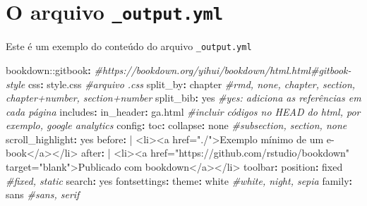 \documentclass[
]{book}
\newenvironment{Shaded}{\begin{snugshade}}{\end{snugshade}}
\newcommand{\AttributeTok}[1]{\textcolor[rgb]{0.77,0.63,0.00}{#1}}
\newcommand{\CharTok}[1]{\textcolor[rgb]{0.31,0.60,0.02}{#1}}
\newcommand{\CommentTok}[1]{\textcolor[rgb]{0.56,0.35,0.01}{\textit{#1}}}
\newcommand{\FunctionTok}[1]{\textcolor[rgb]{0.00,0.00,0.00}{#1}}
\newcommand{\KeywordTok}[1]{\textcolor[rgb]{0.13,0.29,0.53}{\textbf{#1}}}
\newcommand{\NormalTok}[1]{#1}
\begin{document}
\hypertarget{output}{%
\chapter{\texorpdfstring{O arquivo \texttt{\_output.yml}}{O arquivo \_output.yml}}\label{output}}

Este é um exemplo do conteúdo do arquivo \texttt{\_output.yml}

\begin{Shaded}
\begin{Highlighting}[]
\AttributeTok{bookdown:}\FunctionTok{:gitbook}\KeywordTok{:}\CommentTok{ \#https://bookdown.org/yihui/bookdown/html.html\#gitbook{-}style}
\AttributeTok{  }\FunctionTok{css}\KeywordTok{:}\AttributeTok{ style.css}\CommentTok{ \#arquivo .css}
\AttributeTok{  }\FunctionTok{split\_by}\KeywordTok{:}\AttributeTok{ chapter}\CommentTok{ \#rmd, none, chapter, section, chapter+number, section+number}
\AttributeTok{  }\FunctionTok{split\_bib}\KeywordTok{:}\AttributeTok{ }\CharTok{yes}\CommentTok{ \#yes: adiciona as referências em cada página}
\AttributeTok{  }\FunctionTok{includes}\KeywordTok{:}
\AttributeTok{    }\FunctionTok{in\_header}\KeywordTok{:}\AttributeTok{ ga.html}\CommentTok{ \#incluir códigos no HEAD do html, por exemplo, google analytics}
\AttributeTok{  }\FunctionTok{config}\KeywordTok{:}
\AttributeTok{    }\FunctionTok{toc}\KeywordTok{:}
\AttributeTok{      }\FunctionTok{collapse}\KeywordTok{:}\AttributeTok{ none}\CommentTok{ \#subsection, section, none}
\AttributeTok{      }\FunctionTok{scroll\_highlight}\KeywordTok{:}\AttributeTok{ }\CharTok{yes}
\FunctionTok{      before}\KeywordTok{: }\CharTok{|}
\NormalTok{        \textless{}li\textgreater{}\textless{}a href="./"\textgreater{}Exemplo mínimo de um e{-}book\textless{}/a\textgreater{}\textless{}/li\textgreater{}}
\FunctionTok{      after}\KeywordTok{: }\CharTok{|}
\NormalTok{        \textless{}li\textgreater{}\textless{}a href="https://github.com/rstudio/bookdown" target="blank"\textgreater{}Publicado com bookdown\textless{}/a\textgreater{}\textless{}/li\textgreater{}}
\AttributeTok{    }\FunctionTok{toolbar}\KeywordTok{:}
\AttributeTok{      }\FunctionTok{position}\KeywordTok{:}\AttributeTok{ fixed}\CommentTok{ \#fixed, static}
\AttributeTok{    }\FunctionTok{search}\KeywordTok{:}\AttributeTok{ }\CharTok{yes}
\AttributeTok{    }\FunctionTok{fontsettings}\KeywordTok{:}
\AttributeTok{      }\FunctionTok{theme}\KeywordTok{:}\AttributeTok{ white}\CommentTok{ \#white, night, sepia}
\AttributeTok{      }\FunctionTok{family}\KeywordTok{:}\AttributeTok{ sans}\CommentTok{ \#sans, serif}

\end{Highlighting}
\end{Shaded}
\end{document}
